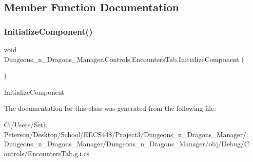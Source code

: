 \subsection{Member Function Documentation}
\mbox{\label{class_dungeons__n___dragons___manager_1_1_controls_1_1_encounters_tab_a66ddb157c3c46a45afce53e377a417cc}} 
\subsubsection{\texorpdfstring{Initialize\+Component()}{InitializeComponent()}}
{\footnotesize\ttfamily void Dungeons\+\_\+n\+\_\+\+Dragons\+\_\+\+Manager.\+Controls.\+Encounters\+Tab.\+Initialize\+Component (\begin{DoxyParamCaption}{ }\end{DoxyParamCaption})\hspace{0.3cm}{\ttfamily [inline]}}



Initialize\+Component 



The documentation for this class was generated from the following file\+:\begin{DoxyCompactItemize}
\item 
C\+:/\+Users/\+Seth Peterson/\+Desktop/\+School/\+E\+E\+C\+S448/\+Project3/\+Dungeons\+\_\+n\+\_\+\+Dragons\+\_\+\+Manager/\+Dungeons\+\_\+n\+\_\+\+Dragons\+\_\+\+Manager/\+Dungeons\+\_\+n\+\_\+\+Dragons\+\_\+\+Manager/obj/\+Debug/\+Controls/Encounters\+Tab.\+g.\+i.\+cs\end{DoxyCompactItemize}

